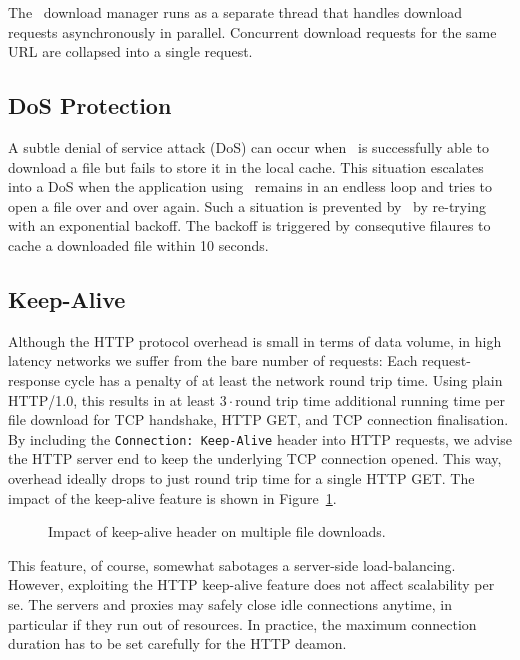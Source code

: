 The \cvmfs\ download manager runs as a separate thread that handles download requests asynchronously in parallel.
Concurrent download requests for the same URL are collapsed into a single request.

\subsection{DoS Protection}
A subtle denial of service attack (DoS) can occur when \cvmfs\ is successfully able to download a file but fails to store it in the local cache.
This situation escalates into a DoS when the application using \cvmfs\ remains in an endless loop and tries to open a file over and over again.
Such a situation is prevented by \cvmfs\ by re-trying with an exponential backoff.
The backoff is triggered by consequtive filaures to cache a downloaded file within 10 seconds.

\subsection{Keep-Alive}
Although the HTTP protocol overhead is small in terms of data volume, in high latency networks we suffer from the bare number of requests: Each request-response cycle has a penalty of at least the network round trip time. 
Using plain HTTP/1.0, this results in at least $3\cdot\text{round trip time}$ additional running time per file download for TCP handshake, HTTP GET, and TCP connection finalisation.
By including the \texttt{Connection:~Keep-Alive} header into HTTP requests, we advise the HTTP server end to keep the underlying TCP connection opened.
This way, overhead ideally drops to just round trip time for a single HTTP GET.
The impact of the keep-alive feature is shown in Figure~\ref{fig:keepalive}.
\begin{figure}
	\begin{center}
		\resizebox{0.5\linewidth}{!}{}
	\end{center}
	\caption{Impact of keep-alive header on multiple file downloads.}
	\label{fig:keepalive}
\end{figure}

This feature, of course, somewhat sabotages a server-side load-balancing.
However, exploiting the HTTP keep-alive feature does not affect scalability per se. 
The servers and proxies may safely close idle connections anytime, in particular if they run out of resources.
In practice, the maximum connection duration has to be set carefully for the HTTP deamon.

